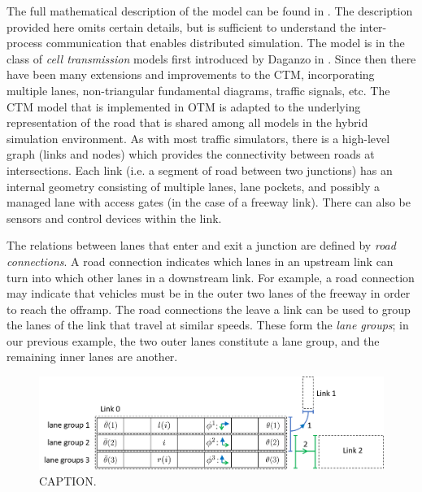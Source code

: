 The full mathematical description of the model can be found in \cite{Gomes2019OpenTM}. The description provided here omits certain details, but is sufficient to understand the inter-process communication that enables distributed simulation. The model is in the class of \textit{cell transmission} models first introduced by Daganzo in \cite{DaganzoCTM}. Since then there have been many extensions and improvements to the CTM, incorporating multiple lanes, non-triangular fundamental diagrams, traffic signals, etc. The CTM model that is implemented in OTM is adapted to the underlying representation of the road that is shared among all models in the hybrid simulation environment. As with most traffic simulators, there is a high-level graph (links and nodes) which provides the connectivity between roads at intersections. Each link (i.e. a segment of road between two junctions) has an internal geometry consisting of multiple lanes, lane pockets, and possibly a managed lane with access gates (in the case of a freeway link). There can also be sensors and control devices within the link. 

The relations between lanes that enter and exit a junction are defined by \textit{road connections}. A road connection indicates which lanes in an upstream link can turn into which other lanes in a downstream link. For example, a road connection may indicate that vehicles must be in the outer two lanes of the freeway in order to reach the offramp. The road connections the leave a link can be used to group the lanes of the link that travel at similar speeds. These form the \textit{lane groups}; in our previous example, the two outer lanes constitute a lane group, and the remaining inner lanes are another. 

\begin{figure}[h!]
    \centering
    \includegraphics[width=\columnwidth]{figs/cells.png}
    \caption{CAPTION.}
    \label{fig:cells}
\end{figure}

